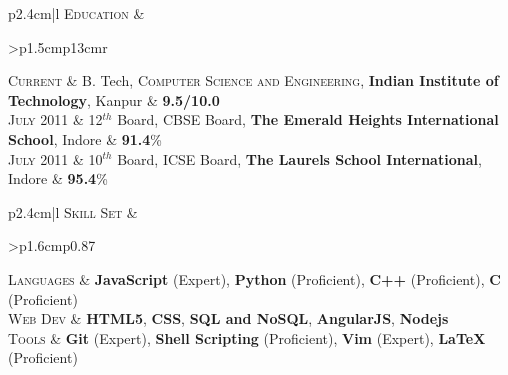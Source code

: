 \documentclass[a4paper]{article} %
\newcommand{\highlight}[2]{
    \begin{tabular}{p{2.4cm}|l}
        \textsc {\large #1} & #2
    \end{tabular}
}
\newcommand{\itemlist}[1]{
    \begin{tabular}{>{\raggedleft}p{1.6cm}p{0.87\linewidth}}
        #1
    \end{tabular}
}
\begin{document}
\highlight
    {Education}
    {\small
        \begin{tabular}{>{\raggedleft}p{1.5cm}p{13cm}r}

            \textsc{Current} & B. Tech, \textsc{Computer Science and Engineering},
                               \textbf{Indian Institute of Technology}, Kanpur
                             & \textbf{9.5/10.0}\\

            \textsc{July 2011} & 12$^{th}$ Board, \textsc{CBSE} Board,
                                 \textbf{The Emerald Heights International School}, Indore
                               & \textbf{91.4}\% \\

            \textsc{July 2011} & 10$^{th}$ Board, \textsc{ICSE} Board,
                                 \textbf{The Laurels School International}, Indore
                               & \textbf{95.4}\% \\

        \end{tabular}
    }

\highlight
    {Skill Set}
    {
        \itemlist {
                \textsc{\small Languages} %
                & \textbf{JavaScript} (Expert), \textbf{Python} (Proficient), \textbf{C++} (Proficient),
                  \textbf{C} (Proficient)\\
                \textsc{\small Web Dev} %
                & \textbf{HTML5}, \textbf{CSS}, \textbf{SQL and NoSQL}, \textbf{AngularJS}, \textbf{Nodejs}\\
                  \textsc{\small Tools} %
                & \textbf{Git} (Expert), \textbf{Shell Scripting} (Proficient), \textbf{Vim} (Expert),
                \textbf{LaTeX} (Proficient)\\
            }
    }

%
%
\end{document}
